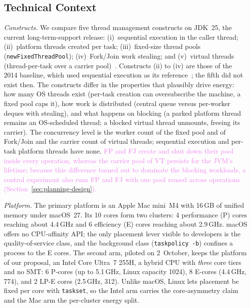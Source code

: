 \documentclass[sigconf,nonacm]{acmart}
\newcommand{\changed}[1]{#1}
\newcommand{\upd}[1]{\textcolor{violet}{#1}}
\begin{document}
\subsection{Technical Context}\label{sec:technical}
\emph{Constructs.} We compare \changed{five} thread management constructs on \changed{JDK~25, the current long-term-support release}: \changed{(i)~sequential execution in the caller thread;} (ii)~platform threads created per task; (iii)~fixed-size thread pools (\texttt{newFixedThreadPool}); (iv)~Fork/Join work stealing; and (v)~virtual threads (thread-per-task over a carrier pool)~\cite{jep444}. \changed{Constructs (ii) to (iv) are those} of the 2014 baseline\changed{, which used sequential execution as its reference}~\cite{pinto2014energy}; the \changed{fifth} did not exist then. The constructs differ in the properties that plausibly drive energy: how many OS threads exist (per-task creation can oversubscribe the machine, a fixed pool caps it), how work is distributed (central queue versus per-worker deques with stealing), and what happens on blocking (a parked platform thread remains an OS-scheduled thread; a blocked virtual thread unmounts, freeing its carrier). \changed{The concurrency level is the worker count of the fixed pool and of Fork/Join and the carrier count of virtual threads; sequential execution and per-task platform threads have none.} \upd{FP and FJ create and shut down their pool inside every operation, whereas the carrier pool of VT persists for the JVM's lifetime; because this difference turned out to dominate the blocking workloads, a control experiment also runs FP and FJ with one pool reused across operations (Section~\ref{sec:planning-design}).}

\emph{Platform.} \changed{The primary platform is an Apple Mac mini~M4 with 16\,GB of unified memory under macOS~27. Its 10 cores form two clusters: 4 performance (P) cores reaching about 4.4\,GHz and 6 efficiency (E) cores reaching about 2.9\,GHz. macOS offers no CPU-affinity API; the only placement lever visible to developers is the quality-of-service class, and the background class (\texttt{taskpolicy -b}) confines a process to the E cores. The second arm, piloted on 2~October, keeps the platform of our proposal,} an Intel Core Ultra~7 255H, a hybrid CPU with \emph{three} core tiers and no SMT: 6 P-cores (up to 5.1\,GHz, Linux capacity 1024), 8 E-cores (4.4\,GHz, 774), and 2 LP-E cores (2.5\,GHz, 312). \changed{Unlike macOS, Linux lets placement be fixed per core with \texttt{taskset}, so the Intel arm carries the core-asymmetry claim and the Mac arm the per-cluster energy split.}
\end{document}
